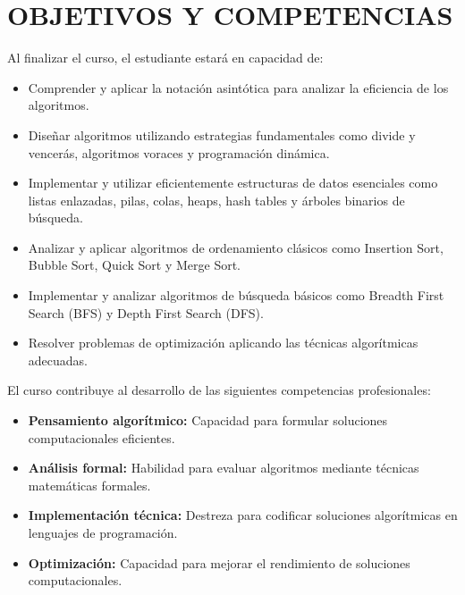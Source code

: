 \documentclass[12pt,a4paper]{article}
\begin{document}
\section{OBJETIVOS Y COMPETENCIAS}

\begin{objetivos}
Al finalizar el curso, el estudiante estará en capacidad de:
\begin{itemize}[leftmargin=*]
    \item Comprender y aplicar la notación asintótica para analizar la eficiencia de los algoritmos.
    \item Diseñar algoritmos utilizando estrategias fundamentales como divide y vencerás, algoritmos voraces y programación dinámica.
    \item Implementar y utilizar eficientemente estructuras de datos esenciales como listas enlazadas, pilas, colas, heaps, hash tables y árboles binarios de búsqueda.
    \item Analizar y aplicar algoritmos de ordenamiento clásicos como Insertion Sort, Bubble Sort, Quick Sort y Merge Sort.
    \item Implementar y analizar algoritmos de búsqueda básicos como Breadth First Search (BFS) y Depth First Search (DFS).
    \item Resolver problemas de optimización aplicando las técnicas algorítmicas adecuadas.
\end{itemize}
\end{objetivos}

\begin{competencias}
El curso contribuye al desarrollo de las siguientes competencias profesionales:
\begin{itemize}[leftmargin=*]
    \item \textbf{Pensamiento algorítmico:} Capacidad para formular soluciones computacionales eficientes.
    \item \textbf{Análisis formal:} Habilidad para evaluar algoritmos mediante técnicas matemáticas formales.
    \item \textbf{Implementación técnica:} Destreza para codificar soluciones algorítmicas en lenguajes de programación.
    \item \textbf{Optimización:} Capacidad para mejorar el rendimiento de soluciones computacionales.
\end{itemize}
\end{competencias}
\vspace{0.5cm}
\end{document}
